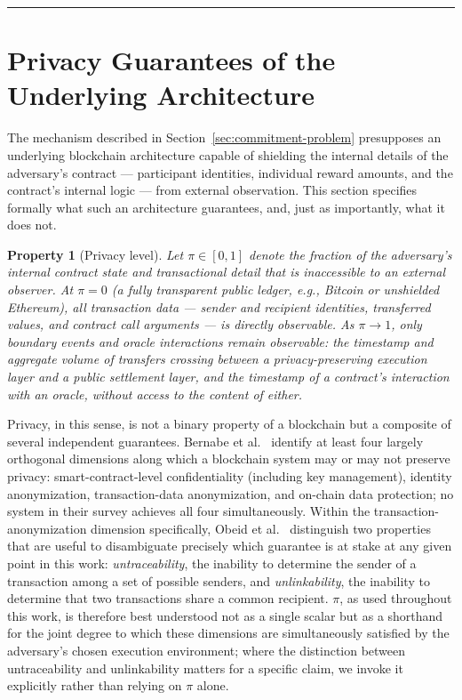 \documentclass[journal,onecolumn,11pt]{IEEEtran}
\newtheorem{property}{Property}
\begin{document}
\bigskip
\hrule
\bigskip

\section{Privacy Guarantees of the Underlying Architecture}
\label{sec:privacy}

The mechanism described in Section~\ref{sec:commitment-problem} presupposes an
underlying blockchain architecture capable of shielding the internal details of
the adversary's contract --- participant identities, individual reward amounts,
and the contract's internal logic --- from external observation. This section
specifies formally what such an architecture guarantees, and, just as
importantly, what it does not.





\begin{property}[Privacy level]
\label{prop:privacy-level}
Let $\pi \in [0,1]$ denote the fraction of the adversary's internal contract
state and transactional detail that is inaccessible to an external observer.
At $\pi = 0$ (a fully transparent public ledger, e.g., Bitcoin or unshielded
Ethereum), all transaction data --- sender and recipient identities, transferred
values, and contract call arguments --- is directly observable. As
$\pi \to 1$, only \emph{boundary events} and \emph{oracle interactions} remain
observable: the timestamp and aggregate volume of transfers crossing between a
privacy-preserving execution layer and a public settlement layer, and the
timestamp of a contract's interaction with an oracle, without access to the
content of either.

\end{property}

Privacy, in this sense, is not a binary property of a blockchain but a
composite of several independent guarantees. Bernabe et
al.~\cite{bernabe2019privacy} identify at least four largely orthogonal
dimensions along which a blockchain system may or may not preserve privacy:
smart-contract-level confidentiality (including key management), identity
anonymization, transaction-data anonymization, and on-chain data protection;
no system in their survey achieves all four simultaneously. Within the
transaction-anonymization dimension specifically, Obeid et
al.~\cite{obeid2025comparative} distinguish two properties that are useful to
disambiguate precisely which guarantee is at stake at any given point in this
work: \emph{untraceability}, the inability to determine the sender of a
transaction among a set of possible senders, and \emph{unlinkability}, the
inability to determine that two transactions share a common recipient. $\pi$,
as used throughout this work, is therefore best understood not as a single
scalar but as a shorthand for the joint degree to which these dimensions are
simultaneously satisfied by the adversary's chosen execution environment;
where the distinction between untraceability and unlinkability matters for a
specific claim, we invoke it explicitly rather than relying on $\pi$ alone.
\end{document}
